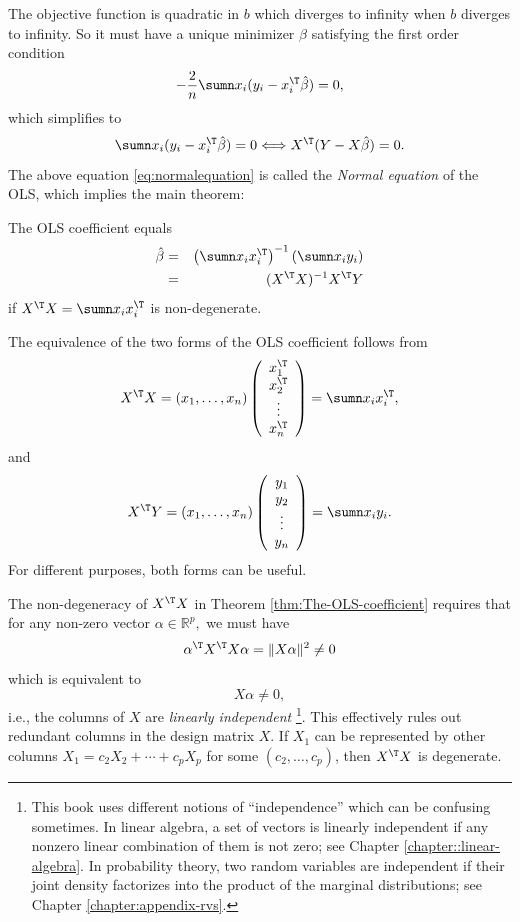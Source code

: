 The objective function is quadratic in $b$ which diverges to
infinity when $b$ diverges to infinity. So it must have a unique minimizer
$\hat{\beta}$ satisfying the first order condition
\[
-\frac{2}{n}\sumn x_{i}(y_{i}-x_{i}^{\T}\hat{\beta})=0,
\]
which simplifies to 
\begin{equation}
\sumn x_{i}(y_{i}-x_{i}^{\T}\hat{\beta})=0\Longleftrightarrow X^{\T}(Y-X\hat{\beta})=0.\label{eq:normalequation}
\end{equation}
The above equation \eqref{eq:normalequation} is called the {\it Normal equation} of the OLS, which implies the main theorem:
\begin{theorem}
\label{thm:The-OLS-coefficient}The OLS coefficient equals
\begin{eqnarray*}
\hat{\beta}
&=&\left(\sumn x_{i}x_{i}^{\T}\right)^{-1}\left(\sumn x_{i}y_{i}\right) \\
&=& (X^{\T}X)^{-1}X^{\T}Y
\end{eqnarray*}
if $X^{\T}X = \sumn x_{i}x_{i}^{\T}$ is non-degenerate. 
\end{theorem}


The equivalence of the two forms of the OLS coefficient follows from
$$
X^{\T}X = (x_1,\ldots, x_n)  \left(\begin{array}{c}
x_{1}^{\T}\\
x_{2}^{\T}\\
\vdots\\
x_{n}^{\T}
\end{array}\right)
= \sumn x_{i}x_{i}^{\T},
$$
and
$$
X^{\T}Y = (x_1,\ldots, x_n)\left(\begin{array}{c}
y_{1}\\
y_{2}\\
\vdots\\
y_{n}
\end{array}\right)
= \sumn x_{i}y_{i}. 
$$
For different purposes, both forms can be useful. 


The non-degeneracy of $X^{\T}X$ in Theorem \ref{thm:The-OLS-coefficient}  requires that for any non-zero vector $\alpha\in\mathbb{R}^{p},$ we must have
\[
\alpha^{\T}X^{\T}X\alpha=\|X\alpha\|^{2}\neq 0 
\]
which is equivalent to
$$
X\alpha\neq 0,
$$
i.e., the columns of $X$ are {\it linearly independent} \footnote{This book uses different notions of ``independence'' which can be confusing sometimes. In linear algebra, a set of vectors is linearly independent if any nonzero linear combination of them is not zero; see Chapter \ref{chapter::linear-algebra}. In probability theory, two random variables are independent if their joint density factorizes into the product of the marginal distributions; see Chapter \ref{chapter:appendix-rvs}.}. This effectively
rules out redundant columns in the design matrix $X$. If $X_1$ can be represented by other columns $X_1 = c_2 X_2 + \cdots + c_p X_p$ for some $(c_2,\ldots, c_p)$, then $X^{\T} X$ is degenerate. 


